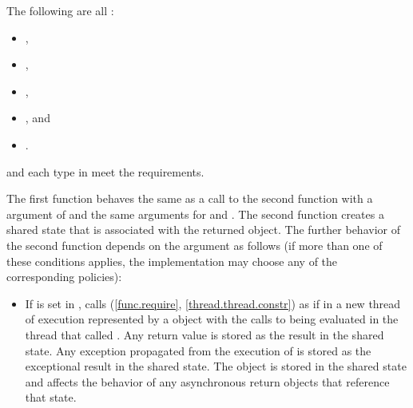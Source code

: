 \begin{itemdescr}
\pnum
\mandates
The following are all :
\begin{itemize}
\item {},
\item {},
\item {},
\item {}, and
\item {}.
\end{itemize}

\pnum
\expects
{} and each type in  meet the  requirements.

\pnum
\effects
The first function
behaves the same as a call to the second function with a  argument of
and the same arguments for  and .
The second function creates a shared state that is associated with
the returned  object.
The further behavior
of the second function depends on the  argument as follows (if
more than one of these conditions applies, the implementation may choose any of
the corresponding policies):

\begin{itemize}
\item
If  is set in , calls
(\ref{func.require}, \ref{thread.thread.constr})
as if in a new thread of execution represented by a  object
with the calls to  being evaluated in the thread that called .
Any return value
is stored as the result in the
shared state. Any exception propagated from
the execution of
is stored as the exceptional result in the shared state.
The  object is
stored in the shared state
and affects the behavior of any asynchronous return objects that
reference that state.


\end{itemize}
\end{itemdescr}
